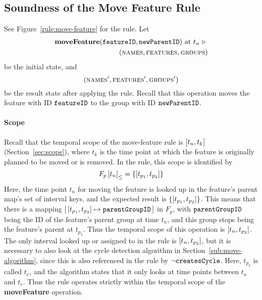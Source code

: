 \subsection{Soundness of the Move Feature Rule}
\label{sub:soundness-of-the-move-reature-rule}

See Figure~\vref{rule:move-feature} for the  rule. Let 
\begin{equation*}
   \begin{split}
      \textbf{moveFeature}(\texttt{featureID}, \texttt{newParentID}) \text{ at } t_n \ \triangleright \  \\
      (\textsc{names}, \textsc{features}, \textsc{groups}{})
   \end{split}
\end{equation*}
be the initial state, and
\[
   (\textsc{names}', \textsc{features}', \textsc{groups}{}')
\]
be the result state after applying the  rule. Recall that this operation moves the feature with ID $\texttt{featureID}$ to the group with ID $\texttt{newParentID}$.

\paragraph{Scope}
\label{par:scope}
Recall that the temporal scope of the move-feature rule is $\interval{t_n}{t_k}$ (Section~\vref{sec:scope}), where $t_k$ is the time point at which the feature is originally planned to be moved or is removed. In the rule, this scope is identified by 
   \[
      \containing{F_p}{t_n} = \set{\interval{t_{p_1}}{t_{p_2}}}
   \]
   Here, the time point $t_n$ for moving the feature is looked up in the feature's parent map's set of interval keys, and the expected result is $\set{\interval{t_{p_1}}{t_{p_2}}}$. This means that there is a mapping $\intervalmapping{t_{p_1}}{t_{p_2}}{\var{parentGroupID}}$ in $F_p$, with $\texttt{parentGroupID}$ being the ID of the feature's parent group at time $t_n$, and this group stops being the feature's parent at $t_{p_2}$. Thus the temporal scope of this operation is $\interval{t_n}{t_{p_2}}$. The only interval looked up or assigned to in the rule is $\interval{t_n}{t_{p_2}}$, but it is necessary to also look at the cycle detection algorithm in Section~\vref{sub:move-algorithm}, since this is also referenced in the rule by $\neg \texttt{createsCycle}$. Here, $t_{p_2}$ is called $t_e$, and the algorithm states that it only looks at time points between $t_n$ and $t_e$. Thus the rule operates strictly within the temporal scope of the \textbf{moveFeature} operation.

